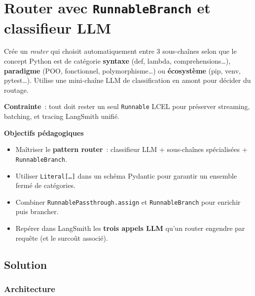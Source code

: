 \documentclass[11pt,a4paper]{article}
\begin{document}
\section{Router avec \texttt{RunnableBranch} et classifieur LLM}

\begin{tcolorbox}[title=Exercice bonus 4. Aiguillage dynamique vers 3 sous-chaînes spécialisées]
Crée un \emph{router} qui choisit automatiquement entre 3 sous-chaînes
selon que le concept Python est de catégorie \textbf{syntaxe} (def, lambda,
comprehensions\dots), \textbf{paradigme} (POO, fonctionnel,
polymorphisme\dots) ou \textbf{écosystème} (pip, venv, pytest\dots).
Utilise une mini-chaîne LLM de classification en amont pour décider du
routage.

\textbf{Contrainte}~: tout doit rester un seul \texttt{Runnable} LCEL
pour préserver streaming, batching, et tracing LangSmith unifié.

\bigskip
\noindent\textbf{Objectifs pédagogiques}
\begin{itemize}[leftmargin=*]
  \item Maîtriser le \textbf{pattern router}~: classifieur LLM + sous-chaînes
        spécialisées + \texttt{RunnableBranch}.
  \item Utiliser \texttt{Literal[\dots]} dans un schéma Pydantic pour
        garantir un ensemble fermé de catégories.
  \item Combiner \texttt{RunnablePassthrough.assign} et
        \texttt{RunnableBranch} pour enrichir puis brancher.
  \item Repérer dans LangSmith les \textbf{trois appels LLM} qu'un router
        engendre par requête (et le surcoût associé).
\end{itemize}
\end{tcolorbox}

\subsection{Solution}

\subsubsection{Architecture}
\end{document}
